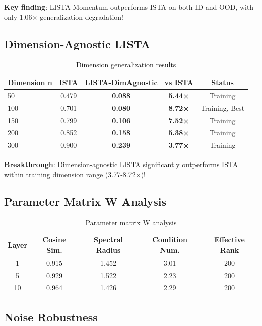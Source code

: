 \documentclass[11pt,a4paper]{article}
\begin{document}
\textbf{Key finding}: LISTA-Momentum outperforms ISTA on both ID and OOD, with only 1.06× generalization degradation!

\subsection{Dimension-Agnostic LISTA}

\begin{table}[h]
\centering
\begin{tabular}{lcccc}
\toprule
\textbf{Dimension n} & \textbf{ISTA} & \textbf{LISTA-DimAgnostic} & \textbf{vs ISTA} & \textbf{Status} \\
\midrule
50 & 0.479 & \textbf{0.088} & \textbf{5.44×} & Training \\
100 & 0.701 & \textbf{0.080} & \textbf{8.72×} & Training, Best \\
150 & 0.799 & \textbf{0.106} & \textbf{7.52×} & Training \\
200 & 0.852 & \textbf{0.158} & \textbf{5.38×} & Training \\
300 & 0.900 & \textbf{0.239} & \textbf{3.77×} & Training \\
\bottomrule
\end{tabular}
\caption{Dimension generalization results}
\label{tab:dim}
\end{table}

\textbf{Breakthrough}: Dimension-agnostic LISTA significantly outperforms ISTA within training dimension range (3.77-8.72×)!

\subsection{Parameter Matrix W Analysis}

\begin{table}[h]
\centering
\begin{tabular}{ccccc}
\toprule
\textbf{Layer} & \textbf{Cosine Sim.} & \textbf{Spectral Radius} & \textbf{Condition Num.} & \textbf{Effective Rank} \\
\midrule
1 & 0.915 & 1.452 & 3.01 & 200 \\
5 & 0.929 & 1.522 & 2.23 & 200 \\
10 & 0.964 & 1.426 & 2.29 & 200 \\
\bottomrule
\end{tabular}
\caption{Parameter matrix W analysis}
\label{tab:w_analysis}
\end{table}

\subsection{Noise Robustness}
\end{document}
